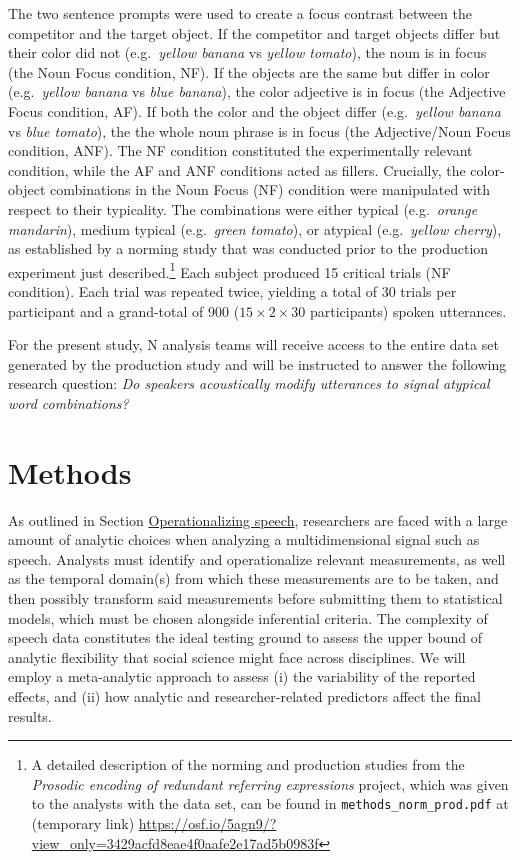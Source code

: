 \documentclass[Review,times,sageh]{sagej}
\begin{document}
The two sentence prompts were used to create a focus contrast between the competitor and the target object.
If the competitor and target objects differ but their color did not (e.g.~\emph{yellow banana} vs \emph{yellow tomato}), the noun is in focus (the Noun Focus condition, NF).
If the objects are the same but differ in color (e.g.~\emph{yellow banana} vs \emph{blue banana}), the color adjective is in focus (the Adjective Focus condition, AF).
If both the color and the object differ (e.g.~\emph{yellow banana} vs \emph{blue tomato}), the the whole noun phrase is in focus (the Adjective/Noun Focus condition, ANF).
The NF condition constituted the experimentally relevant condition, while the AF and ANF conditions acted as fillers.
Crucially, the color-object combinations in the Noun Focus (NF) condition were manipulated with respect to their typicality.
The combinations were either typical (e.g.~\emph{orange mandarin}), medium typical (e.g.~\emph{green tomato}), or atypical (e.g.~\emph{yellow cherry}), as established by a norming study that was conducted prior to the production experiment just described.\footnote{A detailed description of the norming and production studies from the \emph{Prosodic encoding of redundant referring expressions} project, which was given to the analysts with the data set, can be found in \texttt{methods\_norm\_prod.pdf} at (temporary link) \url{https://osf.io/5agn9/?view_only=3429acfd8eae4f0aafe2e17ad5b0983f}}
Each subject produced 15 critical trials (NF condition).
Each trial was repeated twice, yielding a total of 30 trials per participant and a grand-total of 900 (\(15 \times 2 \times 30\) participants) spoken utterances.

For the present study, N analysis teams will receive access to the entire data set generated by the production study and will be instructed to answer the following research question: \emph{Do speakers acoustically modify utterances to signal atypical word combinations?}

\hypertarget{methods}{%
\section{Methods}\label{methods}}

As outlined in Section \protect\hyperlink{s:operspeech}{Operationalizing speech}, researchers are faced with a large amount of analytic choices when analyzing a multidimensional signal such as speech.
Analysts must identify and operationalize relevant measurements, as well as the temporal domain(s) from which these measurements are to be taken, and then possibly transform said measurements before submitting them to statistical models, which must be chosen alongside inferential criteria.
The complexity of speech data constitutes the ideal testing ground to assess the upper bound of analytic flexibility that social science might face across disciplines.
We will employ a meta-analytic approach to assess (i) the variability of the reported effects, and (ii) how analytic and researcher-related predictors affect the final results.
\end{document}
